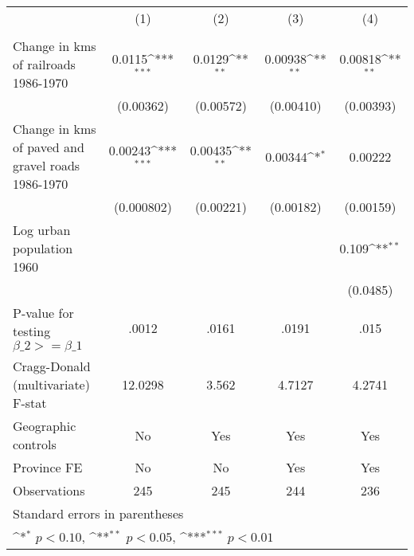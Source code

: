 {
\def\sym#1{\ifmmode^{#1}\else\(^{#1}\)\fi}
\begin{tabular}{l*{4}{c}}
\hline\hline
                &\multicolumn{1}{c}{(1)}&\multicolumn{1}{c}{(2)}&\multicolumn{1}{c}{(3)}&\multicolumn{1}{c}{(4)}\\
                &\multicolumn{1}{c}{}&\multicolumn{1}{c}{}&\multicolumn{1}{c}{}&\multicolumn{1}{c}{}\\
\hline
Change in kms of railroads 1986-1970&   0.0115\sym{***}&   0.0129\sym{**} &  0.00938\sym{**} &  0.00818\sym{**} \\
                &(0.00362)         &(0.00572)         &(0.00410)         &(0.00393)         \\
[1em]
Change in kms of paved and gravel roads 1986-1970&  0.00243\sym{***}&  0.00435\sym{**} &  0.00344\sym{*}  &  0.00222         \\
                &(0.000802)         &(0.00221)         &(0.00182)         &(0.00159)         \\
[1em]
Log urban population 1960&                  &                  &                  &    0.109\sym{**} \\
                &                  &                  &                  & (0.0485)         \\
\hline
P-value for testing $\beta\_{2} >= \beta\_{1}$&    .0012         &    .0161         &    .0191         &     .015         \\
Cragg-Donald (multivariate) F-stat&  12.0298         &    3.562         &   4.7127         &   4.2741         \\
Geographic controls&       No         &      Yes         &      Yes         &      Yes         \\
Province FE     &       No         &       No         &      Yes         &      Yes         \\
Observations    &      245         &      245         &      244         &      236         \\
\hline\hline
\multicolumn{5}{l}{\footnotesize Standard errors in parentheses}\\
\multicolumn{5}{l}{\footnotesize \sym{*} \(p<0.10\), \sym{**} \(p<0.05\), \sym{***} \(p<0.01\)}\\
\end{tabular}
}
